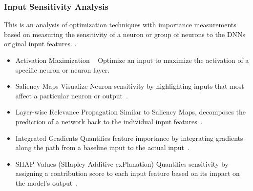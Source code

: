 
\subsubsection{Input Sensitivity Analysis}\label{subsubsec:individual-neuron-importance-analysis}

This is an analysis of optimization techniques with importance measurements based on measuring the sensitivity of a neuron or group of neurons to the DNNs original input features. \@.
\begin{itemize}
    \item Activation Maximization ~\cite{erhan2009visualizing}
    \subitem Optimize an input to maximize the activation of a specific neuron or neuron layer.
    \item Saliency Maps
    \subitem Visualize Neuron sensitivity by highlighting inputs that most affect a particular neuron or output~\cite{hsu2023explainable}.
    \item Layer-wise Relevance Propagation
    \subitem Similar to Saliency Maps, decomposes the prediction of a network back to the individual input features~\cite{jia2022interpreting}.
    \item Integrated Gradients
    \subitem Quantifies feature importance by integrating gradients along the path from a baseline input to the actual input~\cite{sundararajan2017axiomatic}.
    \item SHAP Values (SHapley Additive exPlanation)
    \subitem Quantifies sensitivity by assigning a contribution score to each input feature based on its impact on the model’s output~\cite{nohara2022explanation}.
\end{itemize}